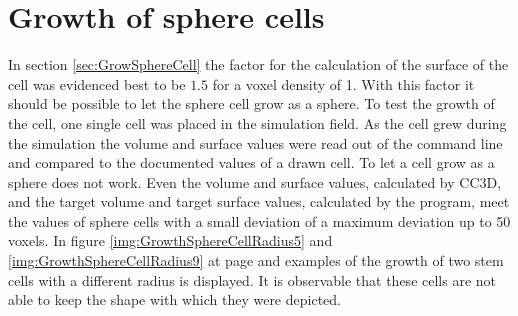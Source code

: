 \section{Growth of sphere cells}\label{sec:GrowSphereCells}
In section \ref{sec:GrowSphereCell} the factor for the calculation of the surface of the cell was evidenced best to be $1.5$ for a voxel density of 1. With this factor it should be possible to let the sphere cell grow as a sphere. To test the growth of the cell, one single cell was placed in the simulation field. As the cell grew during the simulation the volume and surface values were read out of the command line and compared to the documented values of a drawn cell. \newline
To let a cell grow as a sphere does not work. Even the volume and surface values, calculated by \ac{CC3D}, and the target volume and target surface values, calculated by the program, meet the values of sphere cells with a small deviation of a maximum deviation up to 50 voxels. \newline
In figure \ref{img:GrowthSphereCellRadius5} and \ref{img:GrowthSphereCellRadius9} at page \pageref{img:GrowthSphereCellRadius5} and \pageref{img:GrowthSphereCellRadius9} examples of the growth of two stem cells with a different radius is displayed. It is observable that these cells are not able to keep the shape with which they were depicted.


